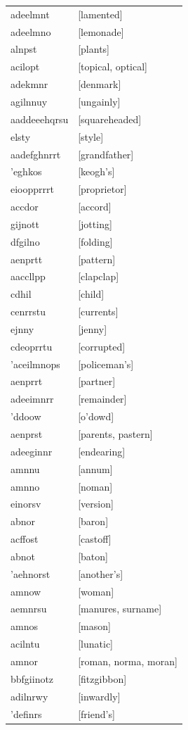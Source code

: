 \documentclass{article}
\begin{document}
\begin{tabular}{ll}
adeelmnt & [lamented] \\
adeelmno & [lemonade] \\
alnpst & [plants] \\
acilopt & [topical, optical] \\
adekmnr & [denmark] \\
agilnnuy & [ungainly] \\
aaddeeehqrsu & [squareheaded] \\
elsty & [style] \\
aadefghnrrt & [grandfather] \\
'eghkos & [keogh's] \\
eioopprrrt & [proprietor] \\
accdor & [accord] \\
gijnott & [jotting] \\
dfgilno & [folding] \\
aenprtt & [pattern] \\
aaccllpp & [clapclap] \\
cdhil & [child] \\
cenrrstu & [currents] \\
ejnny & [jenny] \\
cdeoprrtu & [corrupted] \\
'aceilmnops & [policeman's] \\
aenprrt & [partner] \\
adeeimnrr & [remainder] \\
'ddoow & [o'dowd] \\
aenprst & [parents, pastern] \\
adeeginnr & [endearing] \\
amnnu & [annum] \\
amnno & [noman] \\
einorsv & [version] \\
abnor & [baron] \\
acffost & [castoff] \\
abnot & [baton] \\
'aehnorst & [another's] \\
amnow & [woman] \\
aemnrsu & [manures, surname] \\
amnos & [mason] \\
acilntu & [lunatic] \\
amnor & [roman, norma, moran] \\
bbfgiinotz & [fitzgibbon] \\
adilnrwy & [inwardly] \\
'definrs & [friend's] \\

\end{tabular}
\end{document}
